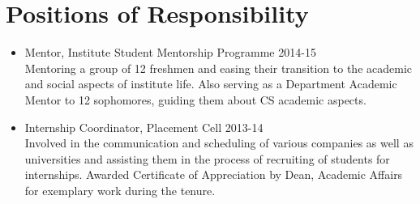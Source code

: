 \documentclass[11pt,a4paper,sans]{moderncv}        %
\begin{document}
\section{Positions of Responsibility}
\begin{itemize}
\item Mentor, Institute Student Mentorship Programme \hfill 2014-15 \\
Mentoring a group of 12 freshmen and easing their transition to the academic and social aspects of institute life. Also serving as a Department Academic Mentor to 12 sophomores, guiding them about CS academic aspects.

\item Internship Coordinator, Placement Cell \hfill 2013-14 \\
Involved in the communication and scheduling of various companies as well as universities and assisting them in the process of recruiting of students for internships. Awarded Certificate of Appreciation by Dean, Academic Affairs for exemplary work during the tenure.

\end{itemize}


%


\end{document}
